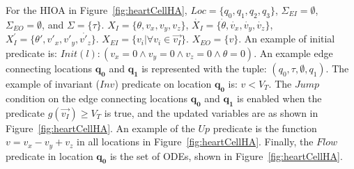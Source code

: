 For the \ac{HIOA} in Figure~\ref{fig:heartCellHA},
$Loc=\{q_{0},q_{1},q_{2},q_{3}\}$, $\Sigma_{EI} = \emptyset$,
$\Sigma_{EO}=\emptyset$, and
$\Sigma=\{\tau\}$. \mbox{$X_{I}=\{\theta,v_{x},v_{y},v_{z}\}$},
\mbox{$\dot{X_{I}}=\{\dot{\theta},\dot{v_{x}},\dot{v_{y}},\dot{v_{z}}\}$},
\mbox{$X^{\prime}_{I}=\{\theta',{v'_{x}},{v'_{y}},\dot{v'_{z}}\}$}.
$X_{EI}=\{v_{i}| \forall v_{i} \in \vec{v_{I}}\}$. $X_{EO}=\{v\}$. An
example of initial predicate is: 
\mbox{$Init(l): (v_{x}=0 \wedge v_{y}=0 \wedge v_{z}=0 \wedge \theta=0)$}. An
example edge connecting locations $\mathbf{q_{0}}$ and $\mathbf{q_{1}}$ is 
represented
with the tuple: $(q_{0},\tau,\emptyset,q_{1})$. The example of invariant
($Inv$) predicate on location $\mathbf{q_{0}}$ is: $v < V_{T}$. The $Jump$ 
condition on
the edge connecting locations $\mathbf{q_{0}}$ and $\mathbf{q_{1}}$ is enabled 
when the
predicate \mbox{$g(\vec{v_{I}}) \geq V_{T}$} is true, and the updated
variables are as shown in Figure~\ref{fig:heartCellHA}. An example of
the $Up$ predicate is the function $v = v_{x} - v_{y} + v_{z}$ in all
locations in Figure~\ref{fig:heartCellHA}. Finally, the $Flow$ predicate
in location $\mathbf{q_{0}}$ is the set of \acp{ODE}, shown in 
Figure~\ref{fig:heartCellHA}.




